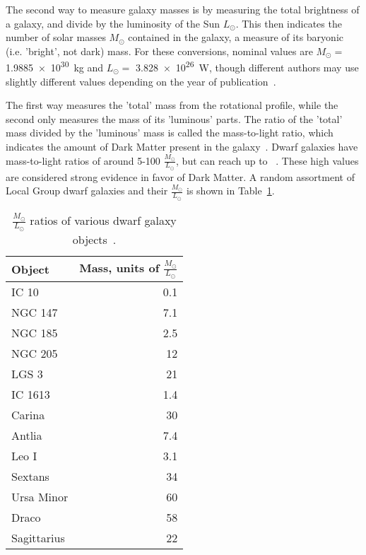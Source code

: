     The second way to measure galaxy masses is by measuring the total brightness of a galaxy, and divide by the luminosity of the Sun $L_\odot$.
    This then indicates the number of solar masses $M_\odot$ contained in the galaxy, a measure of its baryonic (i.e. 'bright', not dark) mass.
    For these conversions, nominal values are $M_\odot =$ \SI{1.9885e30}{kg} and $L_\odot =$ \SI{3.828e26}{W}, though different authors may use slightly different values depending on the year of publication~\cite{iau_solarconstants}.
    
    The first way measures the 'total' mass from the rotational profile, while the second only measures the mass of its 'luminous' parts.
    The ratio of the 'total' mass divided by the 'luminous' mass is called the mass-to-light ratio, which indicates the amount of Dark Matter present in the galaxy~\cite{faber_ml}.
    Dwarf galaxies have mass-to-light ratios of around 5-100 $\frac{M_\odot}{L_\odot}$, but can reach up to ~\cite{Simon2007_dwarfgalaxykeck}.
    These high values are considered strong evidence in favor of Dark Matter.
    A random assortment of Local Group dwarf galaxies and their $\frac{M_\odot}{L_\odot}$ is shown in Table~\ref{tab:mlratios:dwarfgals}.
    
    \begin{table}[]
      \centering
      \caption{$\frac{M_\odot}{L_\odot}$ ratios of various dwarf galaxy objects~\cite{localdwarfs}.}
      \label{tab:mlratios:dwarfgals}
      \begin{tabular}{l r}
        Object      &  Mass, units of $\frac{M_\odot}{L_\odot}$ \\
        \hline
        IC 10       &  0.1 \\
        NGC 147     &  7.1 \\
        NGC 185     &  2.5 \\
        NGC 205     & 12   \\
        LGS 3       & 21   \\
        IC 1613     &  1.4 \\
        Carina      & 30   \\
        Antlia      &  7.4 \\
        Leo I       &  3.1 \\
        Sextans     & 34   \\
        Ursa Minor  & 60   \\
        Draco       & 58   \\
        Sagittarius & 22   \\
      \end{tabular}
    \end{table}
    
